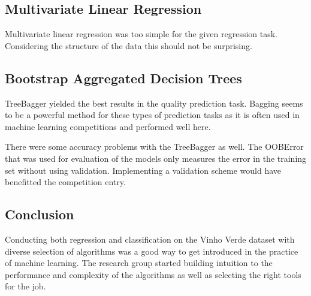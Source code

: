 \subsection{Multivariate Linear Regression}
Multivariate linear regression was too simple for the given regression task. Considering the structure of the data this should not be surprising.

\subsection{Bootstrap Aggregated Decision Trees}
TreeBagger yielded the best results in the quality prediction task. Bagging seems to be a powerful method for these types of prediction tasks as it is often used in machine learning competitions and performed well here.

There were some accuracy problems with the TreeBagger as well. The OOBError that was used for evaluation of the models only measures the error in the training set without using validation. Implementing a validation scheme would have benefitted the competition entry.

\subsection{Conclusion}
Conducting both regression and classification on the Vinho Verde dataset with diverse selection of algorithms was a good way to get introduced in the practice of machine learning. The research group started building intuition to the performance and complexity of the algorithms as well as selecting the right tools for the job.

